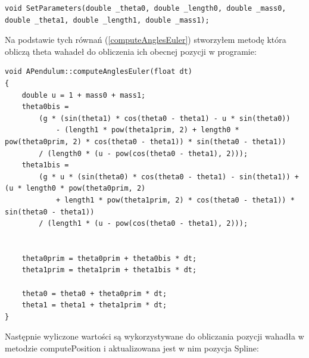 \documentclass[a4paper,12pt,reqno]{article}
\begin{document}
\begin{lstlisting}
void SetParameters(double _theta0, double _length0, double _mass0, double _theta1, double _length1, double _mass1);
\end{lstlisting}

Na podstawie tych równań (\ref{computeAnglesEuler}) stworzyłem metodę która obliczą theta wahadeł do obliczenia ich obecnej pozycji w programie:

\begin{lstlisting}
void APendulum::computeAnglesEuler(float dt)
{
	double u = 1 + mass0 + mass1;
	theta0bis =
		(g * (sin(theta1) * cos(theta0 - theta1) - u * sin(theta0))
			- (length1 * pow(theta1prim, 2) + length0 * pow(theta0prim, 2) * cos(theta0 - theta1)) * sin(theta0 - theta1))
		/ (length0 * (u - pow(cos(theta0 - theta1), 2)));
	theta1bis =
		(g * u * (sin(theta0) * cos(theta0 - theta1) - sin(theta1)) + (u * length0 * pow(theta0prim, 2)
			+ length1 * pow(theta1prim, 2) * cos(theta0 - theta1)) * sin(theta0 - theta1))
		/ (length1 * (u - pow(cos(theta0 - theta1), 2)));


	theta0prim = theta0prim + theta0bis * dt;
	theta1prim = theta1prim + theta1bis * dt;

	theta0 = theta0 + theta0prim * dt;
	theta1 = theta1 + theta1prim * dt;
}
\end{lstlisting}


Następnie wyliczone wartości są wykorzystywane do obliczania pozycji wahadła w metodzie computePosition i aktualizowana jest w nim pozycja Spline:
\end{document}
